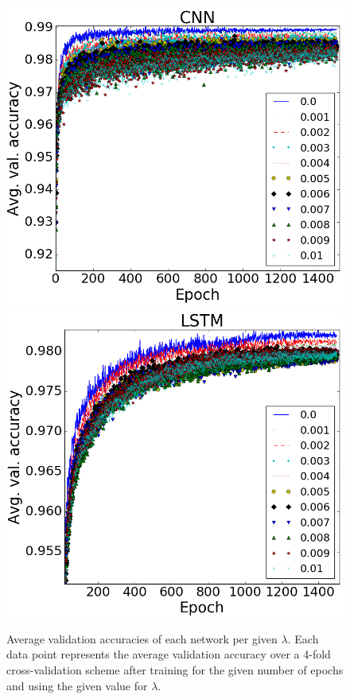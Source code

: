 \documentclass{article} %
\begin{document}
\begin{figure}[h]
\centering
\includegraphics[scale=0.34]{media/CNNPerformance.png}
\includegraphics[scale=0.33]{media/LSTMPerformance.png}
\caption{Average validation accuracies of each network per given $\lambda$. Each data point represents the average validation accuracy over a 4-fold cross-validation scheme after training for the given number of epochs and using the given value for $\lambda$.}
\end{figure}
\end{document}
